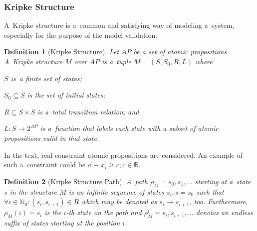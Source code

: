 \documentclass[12pt,oneside,draft]{fithesis}
\newcommand{\mReal}{\mathbb{R}}
\newcommand{\mNatural}{\mathbb{N}}
\newtheorem{mydef}{Definition}
\begin{document}
\subsubsection*{Kripke Structure}
A~Kripke structure is a~common and satisfying way of modeling a~system,
especially for the purpose of the model validation\cite{clarke}.
\begin{mydef}[Kripke Structure]
Let ${AP}$ be a set of atomic propositions.
A~Kripke structure\cite{clarke} $M$ over $AP$ is a~tuple
$M=(S, S_0, R, L)$ where
\begin{inparaenum}
	\item{}$S$ is~a finite set of states;
	\item{}$S_0\subseteq{}S$ is the set of initial states;
	\item{}$R\subseteq{}S\times{}S$ is a~total transition relation; and
	\item{}$L:S\rightarrow{}2^{AP}$ is a~function that labels each state
		with a subset of atomic propositions valid in that state.
\end{inparaenum}
\end{mydef}
In the text, real-constraint atomic propositions are considered.
An example of such a~constraint could be
$a\equiv x_i \geq c;c\in\mReal$.

\begin{mydef}[Kripke Structure Path]
A~path\cite{biere} $\rho_M=s_0,s_1,\dotsc$ starting at a~state
$s$ in the structure $M$ is an infinite sequence of states
$s_i, s = s_0$ such that
$\forall i \in \mNatural_0: (s_i, s_{i+1}) \in R$ which may be denoted
as $s_i\rightarrow s_{i+1}$, too. 
Furthermore, $\rho_M(i)=s_i$ is the $i$-th state on the path and
$\rho_M^i=s_i,s_{i+1},\dotsc$ denotes an endless suffix of states
starting at the position $i$.
\end{mydef}
\end{document}
